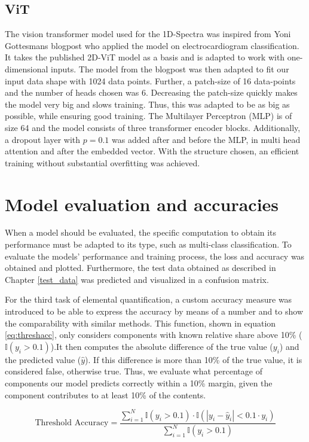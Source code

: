 \subsection{ViT}
The vision transformer model used for the 1D-Spectra was inspired from Yoni Gottesmans blogpost \cite{noauthor_interpretable_2023} who applied the model on electrocardiogram classification. 
It takes the published 2D-ViT model \cite{dosovitskiy_image_2021}as a basis and is adapted to work with one-dimensional inputs.
The model from the blogpost was then adapted to fit our input data shape with 1024 data points. Further, a patch-size of 16 data-points and the number of heads chosen was 6. Decreasing the patch-size quickly makes the model very big and slows training. Thus, this was adapted to be as big as possible, while ensuring good training. 
The Multilayer Perceptron (MLP) is of size 64 and the model consists of three transformer encoder blocks. Additionally, a dropout layer with $p=0.1$ was added after and before the MLP, 
in multi head attention and after the embedded vector.
With the structure chosen, an efficient training without substantial overfitting was achieved. 



\section{Model evaluation and accuracies}

When a model should be evaluated, the specific computation to obtain its performance must be adapted to its type, such as multi-class classification. 
To evaluate the models' performance and training process, the loss and accuracy was obtained and plotted. Furthermore, the test data obtained as described in Chapter \ref{test_data} was predicted and visualized in a confusion matrix.

For the third task of elemental quantification, a custom accuracy measure was introduced to be able to express the accuracy by means of a number and to show the comparability with similar methods. This function, shown in equation \ref{eq:threshacc}, only considers components with known relative share above 10\% ($\mathbb{I}(y_i > 0.1)$).It then computes the absolute difference of the true value ($y_{i}$) and the predicted value ($\hat{y}$). If this difference is more than 10\% of the true value, it is considered false, otherwise true. Thus, we evaluate what percentage of components our model predicts correctly within a 10\% margin, given the component contributes to at least 10\% of the contents.

\begin{equation}
\label{eq:threshacc}
\text{Threshold Accuracy} = \frac{\sum_{i=1}^{N} \mathbb{I}(y_i > 0.1) \cdot \mathbb{I}(|y_i - \hat{y}_i| < 0.1 \cdot y_i)}{\sum_{i=1}^{N} \mathbb{I}(y_i > 0.1)}
\end{equation}

